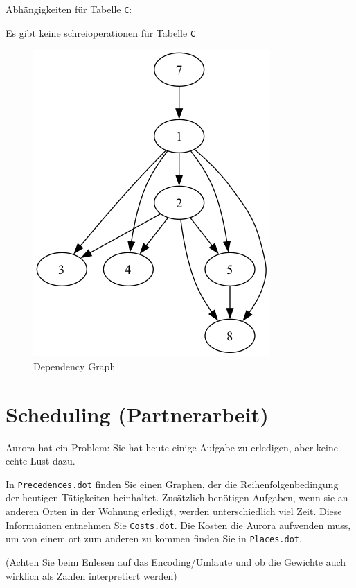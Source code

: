 \documentclass[a4paper,11pt]{report}
\begin{document}
Abhängigkeiten für Tabelle \texttt{C}:

Es gibt keine schreioperationen für Tabelle \texttt{C}

\begin{figure}[htbp]
    \centering
    \includegraphics[height=0.2\textheight]{notebooks/assets/aufgabe_02/dependency_graph}
    \caption{Dependency Graph}
    \label{fig:a02_dependency_graph}
\end{figure}

\newpage

\chapter{Scheduling (Partnerarbeit)}

Aurora hat ein Problem: Sie hat heute einige Aufgabe zu erledigen, aber keine echte Lust dazu.

In \texttt{Precedences.dot} finden Sie einen Graphen, der die Reihenfolgenbedingung der heutigen Tätigkeiten beinhaltet.
Zusätzlich benötigen Aufgaben, wenn sie an anderen Orten in der Wohnung erledigt, werden unterschiedlich viel Zeit.
Diese Informaionen entnehmen Sie \texttt{Costs.dot}.
Die Kosten die Aurora aufwenden muss, um von einem ort zum anderen zu kommen finden Sie in \texttt{Places.dot}.

(Achten Sie beim Enlesen auf das Encoding/Umlaute und ob die Gewichte auch wirklich als Zahlen interpretiert werden)
\end{document}
